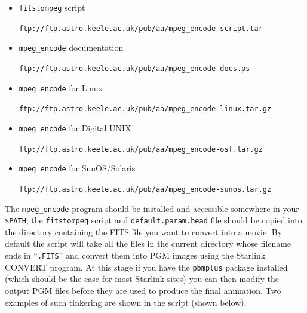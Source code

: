 \documentclass[twoside,11pt]{article}
\newcommand{\htmladdnormallink}[2]{#1}
\newcommand{\htmlref}[2]{#1}
\begin{document}
\begin{itemize}
\item {{\tt fitstompeg} script}\\
\begin{small}\htmladdnormallink{{\tt ftp://ftp.astro.keele.ac.uk/pub/aa/mpeg\_encode-script.tar}}{ftp://ftp.astro.keele.ac.uk/pub/aa/mpeg_encode-script.tar}\end{small}
\item {{\tt mpeg\_encode} documentation}\\
\begin{small}\htmladdnormallink{{\tt ftp://ftp.astro.keele.ac.uk/pub/aa/mpeg\_encode-docs.ps}}{ftp://ftp.astro.keele.ac.uk/pub/aa/mpeg_encode-docs.ps}\end{small}
\item {{\tt mpeg\_encode} for Linux}\\
\begin{small}\htmladdnormallink{{\tt ftp://ftp.astro.keele.ac.uk/pub/aa/mpeg\_encode-linux.tar.gz}}{ftp://ftp.astro.keele.ac.uk/pub/aa/mpeg_encode-linux.tar.gz}\end{small}
\item {{\tt mpeg\_encode} for Digital UNIX}\\
\begin{small}\htmladdnormallink{{\tt ftp://ftp.astro.keele.ac.uk/pub/aa/mpeg\_encode-osf.tar.gz}}{ftp://ftp.astro.keele.ac.uk/pub/aa/mpeg_encode-osf.tar.gz}\end{small}
\item {{\tt mpeg\_encode} for SunOS/Solaris}\\
\begin{small}\htmladdnormallink{{\tt ftp://ftp.astro.keele.ac.uk/pub/aa/mpeg\_encode-sunos.tar.gz}}{ftp://ftp.astro.keele.ac.uk/pub/aa/mpeg_encode-sunos.tar.gz}\end{small}
\end{itemize}

The {\tt mpeg\_encode} program should be installed and accessible somewhere in your {\tt \$PATH}, the {\tt fitstompeg} script and {\tt default.param.head} file should be copied into the directory containing the FITS file you want to convert into a movie. By default the script will take all the files in the current directory whose filename ends in ``{\tt .FITS}'' and convert them into PGM images using the Starlink CONVERT program. At this stage if you have the \htmlref{{\tt pbmplus}}{sc15_pbmplus} package installed (which should be the case for most Starlink sites) you can then modify the output PGM files before they are used to produce the final animation. Two examples of such tinkering are shown in the script (shown below).
\end{document}

